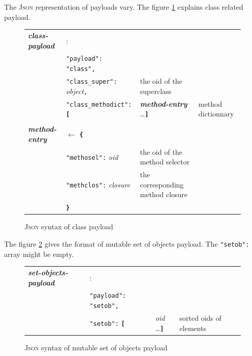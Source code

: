 \documentclass[11pt,a4paper,svgnames]{article}
\begin{document}
The \textsc{Json} representation of payloads vary. The figure
\ref{fig:json-class-payload} explains class related payload.

\begin{figure}[h]
  \begin {center}
    \begin{tabular}{llll}
      \emph{\textbf{class-payload}} & : & ~ & \\
      ~ & \texttt{"payload":} \texttt{"class"}\texttt{,} &  \\
      ~ & \texttt{"class\_super":} \textit{object}\texttt{,} & the oid of the superclass \\
      ~ & \texttt{"class\_methodict":} \textbf{\texttt{[}} &   \emph{\textbf{method-entry}} \ldots  \textbf{\texttt{]}} & method dictionnary \\
      \hline \\
      \emph{\textbf{method-entry}} & $\leftarrow$ \textbf{\texttt{\{}} \\
      ~ &  \texttt{"methosel":} \textit{oid} & the oid of the method selector \\
      ~ &  \texttt{"methclos":} \textit{closure} & the corresponding method closure \\
      ~ &  \textbf{\texttt{\}}} & \\      
    \end{tabular}
  \end {center}
  \caption {\textsc{Json} syntax of class payload}
\label{fig:json-class-payload}  
\end{figure}

 The figure \ref{fig:json-setob-payload} gives the format of mutable
 set of objects payload. The \texttt{"setob":} array might be empty.

\begin{figure}[h]
  \begin {center}
    \begin{tabular}{llll}
      \emph{\textbf{set-objects-payload}} & : & ~ & \\
      ~ & \texttt{"payload":} \texttt{"setob"}\texttt{,} &  \\  
      ~ & \texttt{"setob":} \textbf{\texttt{[}} &  \textit{oid} \ldots  \textbf{\texttt{]}} & sorted oids of elements \\ 
    \end{tabular}
  \end {center}
  \caption {\textsc{Json} syntax of mutable set of objects payload}
\label{fig:json-setob-payload}  
\end{figure}
\end{document}
